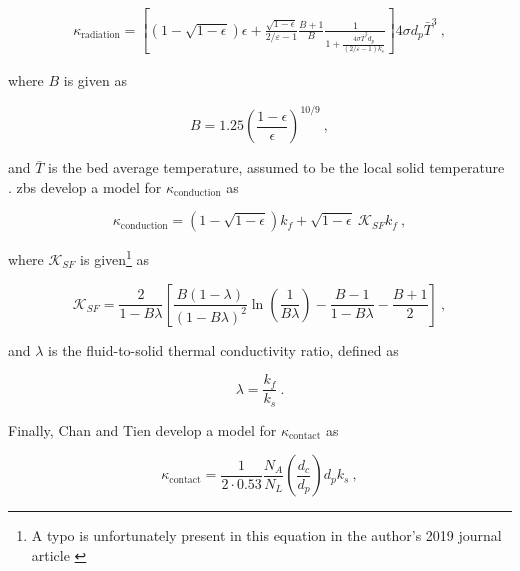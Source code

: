 \begin{equation}
\begin{aligned}
\label{eq:KappaRadiationBB}
\kappa_\text{radiation}=\left\lbrack\left(1-\sqrt{1-\epsilon}\right)\epsilon+\frac{\sqrt{1-\epsilon}}{2/\varepsilon-1}\frac{B+1}{B}\frac{1}{1+\frac{4\sigma\bar{T}^3d_p}{(2/\varepsilon-1)k_s}}\right\rbrack4\sigma d_p\bar{T}^{3}\ ,
\end{aligned}
\end{equation}

\noindent where \(B\) is given as

\begin{equation}
\label{eq:KappaB}
B=1.25\left(\frac{1-\epsilon}{\epsilon}\right)^{10/9}\ ,
\end{equation}

\noindent and \(\bar{T}\) is the bed average temperature, assumed to be the local solid temperature \cite{auwerda_2011,breitbach}. \gls{zbs} develop a model for \(\kappa_\text{conduction}\) as \cite{tsotsas1987}

\begin{equation}
\label{eq:KappaFluidConductionZS}
\kappa_{\textrm{conduction}}=\left(1-\sqrt{1-\epsilon}\right)k_f+\sqrt{1-\epsilon}\ \mathscr{K}_{SF}k_f\ ,
\end{equation}

\noindent where \(\mathscr{K}_{SF}\) is given\hspace{0.02cm}\footnote{A typo is unfortunately present in this equation in the author's 2019 journal article \cite{novak_sana}} as

\begin{equation}
\label{eq:ZBSKSF}
\mathscr{K}_{SF}=\frac{2}{1-B\lambda}\left\lbrack\frac{B(1-\lambda)}{(1-B\lambda)^2}\ln\left({\frac{1}{B\lambda}}\right)-\frac{B-1}{1-B\lambda}-\frac{B+1}{2}\right\rbrack\ ,
\end{equation}

\noindent and \(\lambda\) is the fluid-to-solid thermal conductivity ratio, defined as

\begin{equation}
\label{eq:lambdaDef}
\lambda=\frac{k_f}{k_s}\ .
\end{equation}

\noindent Finally, Chan and Tien develop a model for \(\kappa_\text{contact}\) as \cite{chan}

\begin{equation}
\label{eq:KappaSolidConductionCT}
\kappa_\text{contact}=\frac{1}{2\cdot0.53}\frac{N_A}{N_L}\left(\frac{d_c}{d_p}\right)d_pk_s\ ,
\end{equation}

